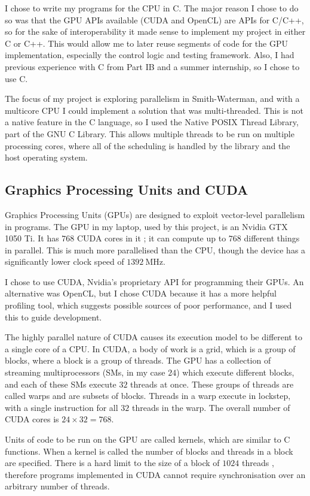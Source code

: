 I chose to write my programs for the CPU in C. The major reason I chose to do so was that the GPU APIs available (CUDA and OpenCL) are APIs for C/C++, so for the sake of interoperability it made sense to implement my project in either C or C++.
This would allow me to later reuse segments of code for the GPU implementation, especially the control logic and testing framework.
Also, I had previous experience with C from Part IB and a summer internship, so I chose to use C.

The focus of my project is exploring parallelism in Smith-Waterman, and with a multicore CPU I could implement a solution that was multi-threaded.
This is not a native feature in the C language, so I used the Native POSIX Thread Library, part of the GNU C Library.
This allows multiple threads to be run on multiple processing cores, where all of the scheduling is handled by the library and the host operating system.

\subsection{Graphics Processing Units and CUDA}
\label{sec:GPU_prep}
Graphics Processing Units (GPUs) are designed to exploit vector-level parallelism in programs. The GPU in my laptop, used by this project, is an Nvidia GTX 1050 Ti.
It has $768$ CUDA cores in it \cite{1050-Ti}; it can compute up to $768$ different things in parallel.
This is much more parallelised than the CPU, though the device has a significantly lower clock speed of $\SI{1392}{\mega\hertz}$.

I chose to use CUDA, Nvidia’s proprietary API for programming their GPUs.
An alternative was OpenCL, but I chose CUDA because it has a more helpful profiling tool, which suggests possible sources of poor performance, and I used this to guide development.

The highly parallel nature of CUDA causes its execution model to be different to a single core of a CPU.
In CUDA, a body of work is a grid, which is a group of blocks, where a block is a group of threads.
The GPU has a collection of streaming multiprocessors (SMs, in my case $24$) which execute different blocks, and each of these SMs execute $32$ threads at once.
These groups of threads are called warps and are subsets of blocks.
Threads in a warp execute in lockstep, with a single instruction for all $32$ threads in the warp.
The overall number of CUDA cores is $24 \times 32=768$.

Units of code to be run on the GPU are called kernels, which are similar to C functions. When a kernel is called the number of blocks and threads in a block are specified.
There is a hard limit to the size of a block of $1024$ threads \cite{CUDA_Guide}, therefore programs implemented in CUDA cannot require synchronisation over an arbitrary number of threads.

